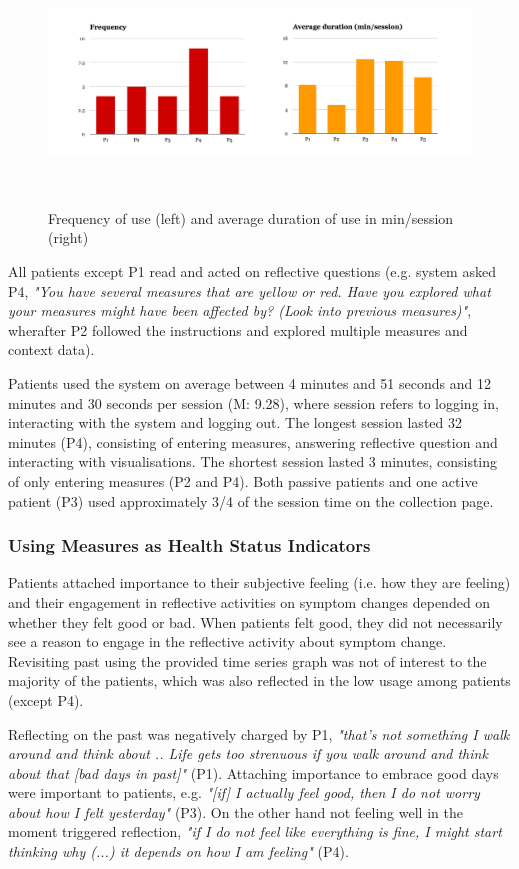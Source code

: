 \begin{figure}
 \centering
 \includegraphics[width=2.1\columnwidth]{img/charts}
 \caption{Frequency of use (left) and average duration of use in min/session (right)}~\label{charts}
\end{figure}

All patients except P1 read and acted on reflective questions (e.g. system asked P4, \textit{"You have several measures that are yellow or red. Have you explored what your measures might have been affected by? (Look into previous measures)"}, wherafter P2 followed the instructions and explored multiple measures and context data). 

Patients used the system on average between 4 minutes and 51 seconds and 12 minutes and 30 seconds per session (M: 9.28), where session refers to logging in, interacting with the system and logging out. The longest session lasted 32 minutes (P4), consisting of entering measures, answering reflective question and interacting with visualisations. The shortest session lasted 3 minutes, consisting of only entering measures (P2 and P4). Both passive patients and one active patient (P3) used approximately 3/4 of the session time on the collection page. 

\subsubsection{Using Measures as Health Status Indicators}
Patients attached importance to their subjective feeling (i.e. how they are feeling) and their engagement in reflective activities on symptom changes depended on whether they felt good or bad. When patients felt good, they did not necessarily see a reason to engage in the reflective activity about symptom change. Revisiting past using the provided time series graph was not of interest to the majority of the patients, which was also reflected in the low usage among patients (except P4). 

Reflecting on the past was negatively charged by P1, \textit{"that's not something I walk around and think about .. Life gets too strenuous if you walk around and think about that [bad days in past]"} (P1). Attaching importance to embrace good days were important to patients, e.g. \textit{"[if] I actually feel good, then I do not worry about how I felt yesterday"} (P3). On the other hand not feeling well in the moment triggered reflection, \textit{"if I do not feel like everything is fine, I might start thinking why (...) it depends on how I am feeling"} (P4). 

